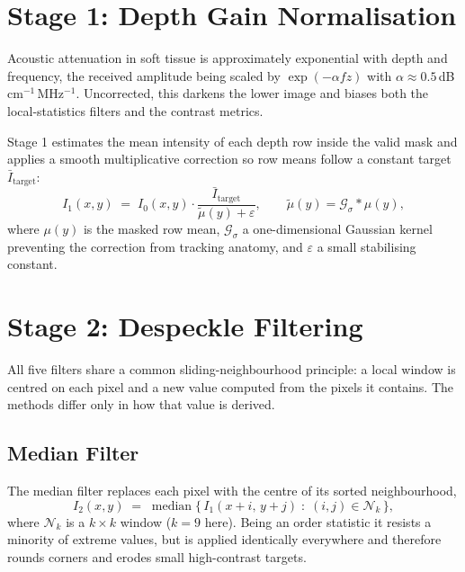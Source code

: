 \documentclass[12pt,a4paper,oneside]{report}
\begin{document}
\section{Stage 1: Depth Gain Normalisation}

Acoustic attenuation in soft tissue is approximately exponential with depth and
frequency, the received amplitude being scaled by $\exp(-\alpha f z)$ with
$\alpha \approx 0.5$\,dB\,cm$^{-1}$\,MHz$^{-1}$. Uncorrected, this darkens the
lower image and biases both the local-statistics filters and the contrast
metrics.

Stage 1 estimates the mean intensity of each depth row inside the valid mask and
applies a smooth multiplicative correction so row means follow a constant target
$\bar{I}_{\text{target}}$:
\begin{equation}
I_1(x,y) \;=\; I_0(x,y)\cdot
   \frac{\bar{I}_{\text{target}}}{\tilde{\mu}(y)+\varepsilon},
\qquad
\tilde{\mu}(y) = \mathcal{G}_\sigma \!*\! \mu(y),
\label{eq:dgc}
\end{equation}
where $\mu(y)$ is the masked row mean, $\mathcal{G}_\sigma$ a one-dimensional
Gaussian kernel preventing the correction from tracking anatomy, and
$\varepsilon$ a small stabilising constant.

\section{Stage 2: Despeckle Filtering}

All five filters share a common sliding-neighbourhood principle: a local window is
centred on each pixel and a new value computed from the pixels it contains. The
methods differ only in how that value is derived.



\subsection{Median Filter}

The median filter replaces each pixel with the centre of its sorted
neighbourhood,
\begin{equation}
I_2(x,y) \;=\; \operatorname{median}
  \bigl\{\, I_1(x+i,\,y+j) \;:\; (i,j)\in \mathcal{N}_k \,\bigr\},
\label{eq:median}
\end{equation}
where $\mathcal{N}_k$ is a $k\times k$ window ($k=9$ here). Being an order
statistic it resists a minority of extreme values, but is applied identically
everywhere and therefore rounds corners and erodes small high-contrast targets.
\end{document}
